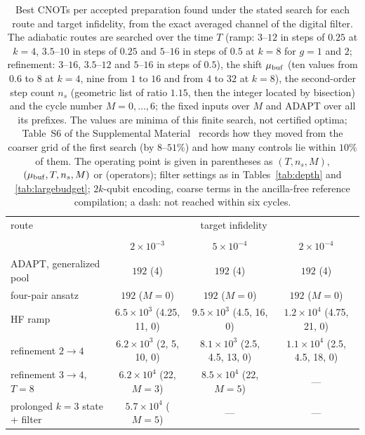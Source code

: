 \documentclass[
  aps,            %
  prc,            %
  reprint,        %
  superscriptaddress,
  floatfix,
  nofootinbib
]{revtex4-2}
\newcommand{\SM}{Supplemental Material~\cite{SM}}
\begin{document}
\begin{table}[t]
\caption{\label{tab:frontier}Best CNOTs per accepted preparation found
under the stated search for each route and target infidelity, from the
exact averaged channel of the digital filter.  The adiabatic routes are
searched over the time $T$ (ramp: $3$--$12$ in steps of $0.25$ at $k=4$,
$3.5$--$10$ in steps of $0.25$ and $5$--$16$ in steps of $0.5$ at $k=8$
for $g=1$ and $2$; refinement: $3$--$16$, $3.5$--$12$ and $5$--$16$ in
steps of $0.5$), the shift $\mu_{\rm buf}$ (ten values from $0.6$ to $8$ at
$k=4$, nine from $1$ to $16$ and from $4$ to $32$ at $k=8$), the
second-order step count $n_s$ (geometric list of ratio $1.15$, then the
integer located by bisection) and the cycle number $M=0,\ldots,6$; the
fixed inputs over $M$ and ADAPT over all its prefixes.  The values are
minima of this finite search, not certified optima; Table~S6 of the \SM{}
records how they moved from the coarser grid of the first search
(by $8$--$51\%$) and how many controls lie within $10\%$ of them.  The
operating point is given in parentheses as $(T,n_s,M)$,
$(\mu_{\rm buf},T,n_s,M)$ or (operators); filter settings as in
Tables~\ref{tab:depth} and \ref{tab:largebudget}; $2k$-qubit encoding,
coarse terms in the ancilla-free reference compilation; a dash: not
reached within six cycles.}
\footnotesize
\begin{ruledtabular}
\begin{tabular}{lccc}
route & \multicolumn{3}{c}{target infidelity}\\
\colrule
\multicolumn{4}{l}{$k=4$, $N=4$, $g=1$ ($\delta t=0.25$, $\sigma=4$, cycle $1.1\times10^{4}$ CNOTs)} \\
 & $2\times10^{-3}$ & $5\times10^{-4}$ & $2\times10^{-4}$\\
ADAPT, generalized pool & $192$ (4) & $192$ (4) & $192$ (4)\\
four-pair ansatz & $192$ ($M{=}0$) & $192$ ($M{=}0$) & $192$ ($M{=}0$)\\
HF ramp & $6.5\times10^{3}$ (4.25, 11, 0) & $9.5\times10^{3}$ (4.5, 16, 0) & $1.2\times10^{4}$ (4.75, 21, 0)\\
refinement $2\to4$ & $6.2\times10^{3}$ (2, 5, 10, 0) & $8.1\times10^{3}$ (2.5, 4.5, 13, 0) & $1.1\times10^{4}$ (2.5, 4.5, 18, 0)\\
refinement $3\to4$, $T=8$ & $6.2\times10^{4}$ (22, $M{=}3$) & $8.5\times10^{4}$ (22, $M{=}5$) & ---\\
prolonged $k{=}3$ state + filter & $5.7\times10^{4}$ ($M{=}5$) & --- & ---\\

\end{tabular}
\end{ruledtabular}
\end{table}
\end{document}
